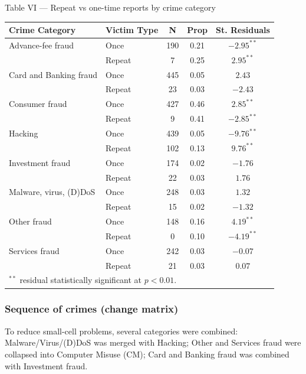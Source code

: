 \documentclass[11pt,a4paper,openany]{report}
\theoremstyle{definition}
\theoremstyle{plain}
\theoremstyle{remark}
\begin{document}
\begin{datapanel}{Table VI --- Repeat vs one-time reports by crime category}
\begin{center}
\begin{tabular}{llccc}
\toprule
\textbf{Crime Category} & \textbf{Victim Type} & \textbf{N} & \textbf{Prop} & \textbf{St. Residuals} \\
\midrule
Advance-fee fraud      & Once   & 190 & 0.21 & $-2.95^{**}$ \\
                       & Repeat & 7   & 0.25 & $2.95^{**}$ \\
Card and Banking fraud & Once   & 445 & 0.05 & $2.43$ \\
                       & Repeat & 23  & 0.03 & $-2.43$ \\
Consumer fraud         & Once   & 427 & 0.46 & $2.85^{**}$ \\
                       & Repeat & 9   & 0.41 & $-2.85^{**}$ \\
Hacking                & Once   & 439 & 0.05 & $-9.76^{**}$ \\
                       & Repeat & 102 & 0.13 & $9.76^{**}$ \\
Investment fraud       & Once   & 174 & 0.02 & $-1.76$ \\
                       & Repeat & 22  & 0.03 & $1.76$ \\
Malware, virus, (D)DoS & Once   & 248 & 0.03 & $1.32$ \\
                       & Repeat & 15  & 0.02 & $-1.32$ \\
Other fraud            & Once   & 148 & 0.16 & $4.19^{**}$ \\
                       & Repeat & 0   & 0.10 & $-4.19^{**}$ \\
Services fraud         & Once   & 242 & 0.03 & $-0.07$ \\
                       & Repeat & 21  & 0.03 & $0.07$ \\
\bottomrule
\multicolumn{5}{l}{\footnotesize $^{**}$ residual statistically significant at $p < 0.01$.}
\end{tabular}
\end{center}
\end{datapanel}

\subsubsection*{Sequence of crimes (change matrix)}

To reduce small-cell problems, several categories were combined: Malware/Virus/(D)DoS was merged with Hacking; Other and Services fraud were collapsed into Computer Misuse (CM); Card and Banking fraud was combined with Investment fraud.
\end{document}
